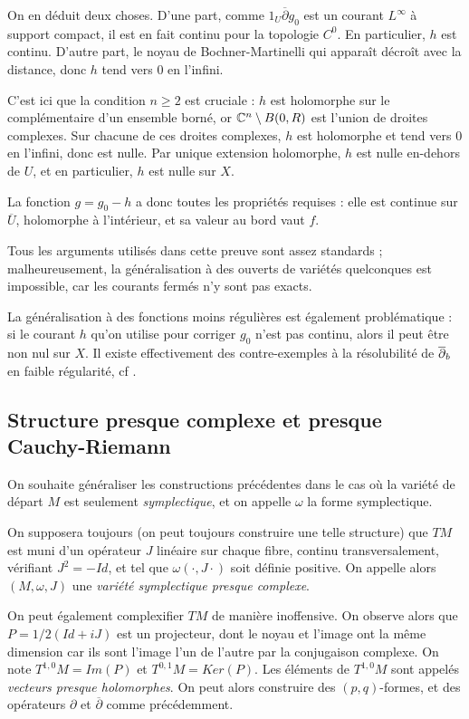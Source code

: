 \begin{preuve}
	 On en déduit deux choses. D'une part, comme $1_U\overline{\partial}g_0$ est un courant $L^{\infty}$ à support compact, il est en fait continu pour la topologie $C^0$. En particulier, $h$ est continu. D'autre part, le noyau de Bochner-Martinelli qui apparaît décroît avec la distance, donc $h$ tend vers $0$ en l'infini.
	
	C'est ici que la condition $n \geq 2$ est cruciale : $h$ est holomorphe sur le complémentaire d'un ensemble borné, or $\mathbb{C}^n \setminus B(0,R)$ est l'union de droites complexes. Sur chacune de ces droites complexes, $h$ est holomorphe et tend vers $0$ en l'infini, donc est nulle. Par unique extension holomorphe, $h$ est nulle en-dehors de $U$, et en particulier, $h$ est nulle sur $X$.
	
	La fonction $g=g_0-h$ a donc toutes les propriétés requises : elle est continue sur $\overline{U}$, holomorphe à l'intérieur, et sa valeur au bord vaut $f$.
\end{preuve}

Tous les arguments utilisés dans cette preuve sont assez standards ; malheureusement, la généralisation à des ouverts de variétés quelconques est impossible, car les courants fermés n'y sont pas exacts.

La généralisation à des fonctions moins régulières est également problématique : si le courant $h$ qu'on utilise pour corriger $g_0$ n'est pas continu, alors il peut être non nul sur $X$. Il existe effectivement des contre-exemples à la résolubilité de $\overline{\partial}_b$ en faible régularité, cf \cite{kohn1965extension}.

\subsection{Structure presque complexe et presque Cauchy-Riemann}
On souhaite généraliser les constructions précédentes dans le cas où la variété de départ $M$ est seulement \emph{symplectique}, et on appelle $\omega$ la forme symplectique.

On supposera toujours (on peut toujours construire une telle structure) que $TM$ est muni d'un opérateur $J$ linéaire sur chaque fibre, continu transversalement, vérifiant $J^2=-Id$, et tel que $\omega(\cdot, J\cdot)$ soit définie positive. On appelle alors $(M,\omega, J)$ une \emph{variété symplectique presque complexe}.

On peut également complexifier $TM$ de manière inoffensive. On observe alors que $P=1/2(Id+iJ)$ est un projecteur, dont le noyau et l'image ont la même dimension car ils sont l'image l'un de l'autre par la conjugaison complexe. On note $T^{1,0}M=Im(P)$ et $T^{0,1}M=Ker(P)$. Les éléments de $T^{1,0}M$ sont appelés \emph{vecteurs presque holomorphes}. On peut alors construire des $(p,q)$-formes, et des opérateurs $\partial$ et $\overline{\partial}$ comme précédemment.

